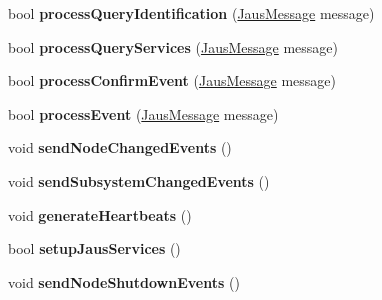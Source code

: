 \begin{DoxyCompactItemize}
\item 
\hypertarget{class_node_manager_component_af6367ecc5cafb13d249ea219dc11b562}{bool {\bfseries process\-Query\-Identification} (\hyperlink{struct_jaus_message_struct}{\-Jaus\-Message} message)}\label{class_node_manager_component_af6367ecc5cafb13d249ea219dc11b562}

\item 
\hypertarget{class_node_manager_component_a81e48c82426663c1e178970e4f7a5ce5}{bool {\bfseries process\-Query\-Services} (\hyperlink{struct_jaus_message_struct}{\-Jaus\-Message} message)}\label{class_node_manager_component_a81e48c82426663c1e178970e4f7a5ce5}

\item 
\hypertarget{class_node_manager_component_a0b4fff512c09a2bf349692da73effb55}{bool {\bfseries process\-Confirm\-Event} (\hyperlink{struct_jaus_message_struct}{\-Jaus\-Message} message)}\label{class_node_manager_component_a0b4fff512c09a2bf349692da73effb55}

\item 
\hypertarget{class_node_manager_component_ae2fc73df031051b3561e1a36f09f0806}{bool {\bfseries process\-Event} (\hyperlink{struct_jaus_message_struct}{\-Jaus\-Message} message)}\label{class_node_manager_component_ae2fc73df031051b3561e1a36f09f0806}

\item 
\hypertarget{class_node_manager_component_a087200391dfadaf76f079dea874ddc27}{void {\bfseries send\-Node\-Changed\-Events} ()}\label{class_node_manager_component_a087200391dfadaf76f079dea874ddc27}

\item 
\hypertarget{class_node_manager_component_a92cd7849524c23022674f52a2622ab3a}{void {\bfseries send\-Subsystem\-Changed\-Events} ()}\label{class_node_manager_component_a92cd7849524c23022674f52a2622ab3a}

\item 
\hypertarget{class_node_manager_component_a11b72da2ebc48d88325ee56b54d00893}{void {\bfseries generate\-Heartbeats} ()}\label{class_node_manager_component_a11b72da2ebc48d88325ee56b54d00893}

\item 
\hypertarget{class_node_manager_component_abdb4b69b56e4c21e6bd627b351512747}{bool {\bfseries setup\-Jaus\-Services} ()}\label{class_node_manager_component_abdb4b69b56e4c21e6bd627b351512747}

\item 
\hypertarget{class_node_manager_component_a6bc950c01c2e8859afba41bde4a416a5}{void {\bfseries send\-Node\-Shutdown\-Events} ()}\label{class_node_manager_component_a6bc950c01c2e8859afba41bde4a416a5}


\end{DoxyCompactItemize}
